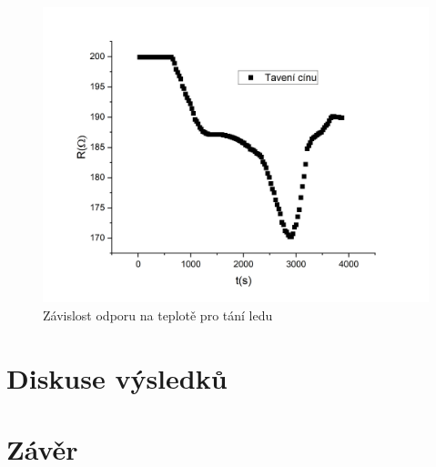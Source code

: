 \begin{figure}[h]
    \centering
    \includegraphics[width=0.5\linewidth]{8 - Kalibrace odporového teploměru a termočlánku//Prototkol - kalibrace teploměru//img/Závislost R na t, tavení cínu.png}
    \caption{Závislost odporu na teplotě pro tání ledu}
    \label{fig:odpor-na-teplote-var}
\end{figure}

\section{Diskuse výsledků}

\section{Závěr}
